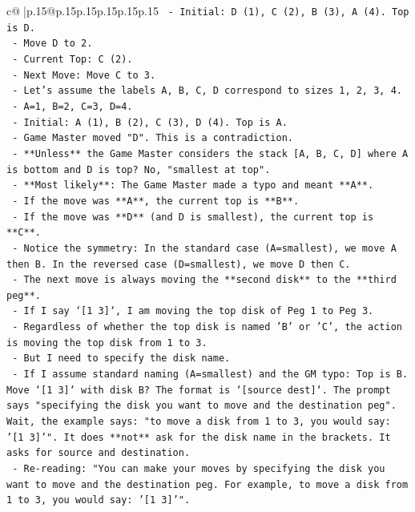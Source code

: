 \documentclass{article}
\begin{document}
{\begin{supertabular}{c@{$\;$}|p{.15\linewidth}@{}p{.15\linewidth}p{.15\linewidth}p{.15\linewidth}p{.15\linewidth}p{.15\linewidth}}
{{{\texttt{            {-} Initial: D (1), C (2), B (3), A (4). Top is D.} \\
\texttt{            {-} Move D to 2.} \\
\texttt{            {-} Current Top: C (2).} \\
\texttt{            {-} Next Move: Move C to 3.} \\
\texttt{        {-} Let's assume the labels A, B, C, D correspond to sizes 1, 2, 3, 4.} \\
\texttt{            {-} A=1, B=2, C=3, D=4.} \\
\texttt{            {-} Initial: A (1), B (2), C (3), D (4). Top is A.} \\
\texttt{            {-} Game Master moved "D". This is a contradiction.} \\
\texttt{            {-} **Unless** the Game Master considers the stack {[}A, B, C, D{]} where A is bottom and D is top? No, "smallest at top".} \\
\texttt{            {-} **Most likely**: The Game Master made a typo and meant **A**.} \\
\texttt{            {-} If the move was **A**, the current top is **B**.} \\
\texttt{            {-} If the move was **D** (and D is smallest), the current top is **C**.} \\
\texttt{            {-} Notice the symmetry: In the standard case (A=smallest), we move A then B. In the reversed case (D=smallest), we move D then C.} \\
\texttt{            {-} The next move is always moving the **second disk** to the **third peg**.} \\
\texttt{            {-} If I say `{[}1 3{]}`, I am moving the top disk of Peg 1 to Peg 3.} \\
\texttt{            {-} Regardless of whether the top disk is named 'B' or 'C', the action is moving the top disk from 1 to 3.} \\
\texttt{            {-} But I need to specify the disk name.} \\
\texttt{            {-} If I assume standard naming (A=smallest) and the GM typo: Top is B. Move `{[}1 3{]}` with disk B? The format is `{[}source dest{]}`. The prompt says "specifying the disk you want to move and the destination peg". Wait, the example says: "to move a disk from 1 to 3, you would say: '{[}1 3{]}'". It does **not** ask for the disk name in the brackets. It asks for source and destination.} \\
\texttt{            {-} Re{-}reading: "You can make your moves by specifying the disk you want to move and the destination peg. For example, to move a disk from 1 to 3, you would say: '{[}1 3{]}'".} \\
}}}
\end{supertabular}}
\end{document}

